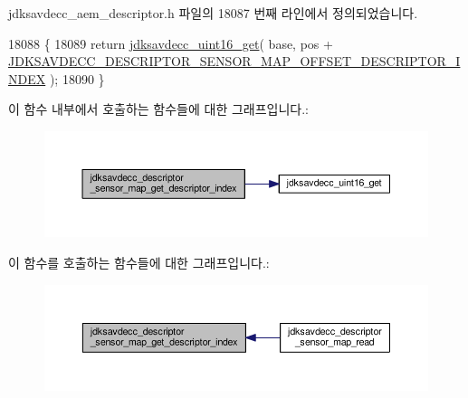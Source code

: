 jdksavdecc\+\_\+aem\+\_\+descriptor.\+h 파일의 18087 번째 라인에서 정의되었습니다.


\begin{DoxyCode}
18088 \{
18089     \textcolor{keywordflow}{return} \hyperlink{group__endian_ga3fbbbc20be954aa61e039872965b0dc9}{jdksavdecc\_uint16\_get}( base, pos + 
      \hyperlink{group__descriptor__sensor__map_ga37f3a3f7faecf126d1471fbc82c970f2}{JDKSAVDECC\_DESCRIPTOR\_SENSOR\_MAP\_OFFSET\_DESCRIPTOR\_INDEX}
       );
18090 \}
\end{DoxyCode}


이 함수 내부에서 호출하는 함수들에 대한 그래프입니다.\+:
\nopagebreak
\begin{figure}[H]
\begin{center}
\leavevmode
\includegraphics[width=350pt]{group__descriptor__sensor__map_gafad365d30993d11efe48a49ce1c49e40_cgraph}
\end{center}
\end{figure}




이 함수를 호출하는 함수들에 대한 그래프입니다.\+:
\nopagebreak
\begin{figure}[H]
\begin{center}
\leavevmode
\includegraphics[width=350pt]{group__descriptor__sensor__map_gafad365d30993d11efe48a49ce1c49e40_icgraph}
\end{center}
\end{figure}


